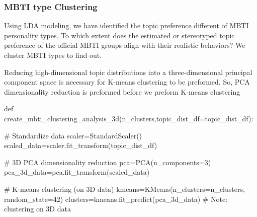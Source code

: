 \documentclass[12pt]{article}
\numberwithin{figure}{section}  %
\begin{document}
	
	
	
 	\subsubsection{MBTI type Clustering} 
	Using LDA modeling, we have identified the topic preference different of
	MBTI personality types. To which extent does the estimated or stereotyped
	topic preference of the official MBTI groups align with their realistic
	behaviors? We cluster MBTI types to find out.
	
	Reducing high-dimensional topic distributions into a three-dimensional
	principal component space is necessary for K-means clustering to be
	preformed. So, PCA dimensionality reduction is preformed before we preform
	K-means clustering
	\begin{python}
def create_mbti_clustering_analysis_3d(n_clusters,topic_dist_df=topic_dist_df):
    
    # Standardize data
    scaler=StandardScaler()
    scaled_data=scaler.fit_transform(topic_dist_df)
    
    # 3D PCA dimensionality reduction
    pca=PCA(n_components=3)
    pca_3d_data=pca.fit_transform(scaled_data)
    
    # K-means clustering (on 3D data)
    kmeans=KMeans(n_clusters=n_clusters, random_state=42)
    clusters=kmeans.fit_predict(pca_3d_data)  # Note: clustering on 3D data
	\end{python}
\end{document}
